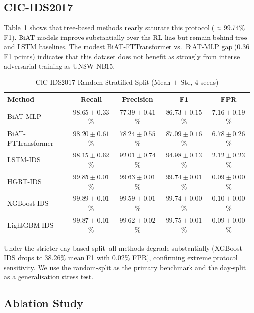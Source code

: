 \subsection{CIC-IDS2017}

Table~\ref{tab:cic_random} shows that tree-based methods nearly saturate this protocol ($\approx$99.74\% F1). BiAT models improve substantially over the RL line but remain behind tree and LSTM baselines. The modest BiAT-FTTransformer vs.\ BiAT-MLP gap (0.36 F1 points) indicates that this dataset does not benefit as strongly from intense adversarial training as UNSW-NB15.

\begin{table}[h]
    \centering
    \caption{CIC-IDS2017 Random Stratified Split (Mean $\pm$ Std, 4 seeds)}
    \label{tab:cic_random}
    \begin{tabular}{lcccc}
        \toprule
        \textbf{Method} & \textbf{Recall} & \textbf{Precision} & \textbf{F1} & \textbf{FPR} \\
        \midrule
        BiAT-MLP             & $98.65{\pm}0.33$\% & $77.39{\pm}0.41$\% & $86.73{\pm}0.15$\% & $7.16{\pm}0.19$\% \\
        BiAT-FTTransformer   & $98.20{\pm}0.61$\% & $78.24{\pm}0.55$\% & $87.09{\pm}0.16$\% & $6.78{\pm}0.26$\% \\
        LSTM-IDS             & $98.15{\pm}0.62$\% & $92.01{\pm}0.74$\% & $94.98{\pm}0.13$\% & $2.12{\pm}0.23$\% \\
        HGBT-IDS             & $99.85{\pm}0.01$\% & $99.63{\pm}0.01$\% & $99.74{\pm}0.01$\% & $\mathbf{0.09{\pm}0.00}$\% \\
        XGBoost-IDS          & $\mathbf{99.89{\pm}0.01}$\% & $99.59{\pm}0.01$\% & $99.74{\pm}0.00$\% & $0.10{\pm}0.00$\% \\
        LightGBM-IDS         & $99.87{\pm}0.01$\% & $\mathbf{99.62{\pm}0.02}$\% & $\mathbf{99.75{\pm}0.01}$\% & $\mathbf{0.09{\pm}0.00}$\% \\
        \bottomrule
    \end{tabular}
\end{table}

Under the stricter day-based split, all methods degrade substantially (XGBoost-IDS drops to 38.26\% mean F1 with 0.02\% FPR), confirming extreme protocol sensitivity. We use the random-split as the primary benchmark and the day-split as a generalization stress test.

\subsection{Ablation Study}

